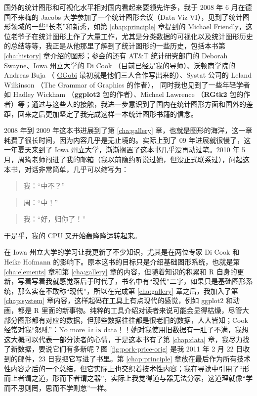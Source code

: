 \documentclass[
  b5paper,
  UTF8,twoside]{book}
\begin{document}
国外的统计图形和可视化水平相对国内看起来要领先许多，我于 2008 年 6 月在德国不来梅的 Jacobs 大学参加了一个统计图形会议（Data Viz VI），见到了统计图形领域的一些``长老''和新秀，如第 \ref{chap:principle} 章提到的 Michael Friendly，这位老爷子在统计图形上作了大量工作，尤其是分类数据的可视化以及统计图形历史的总结等等，我正是从他那里了解到了统计图形的一些历史，包括本书第 \ref{cha:history} 章介绍的图形；参会的还有 AT\&T 统计研究部门的 Deborah Swayne、Iowa 州立大学的 Di Cook （目前已经是我的导师）、沃顿商学院的 Andreas Buja （ \href{http://www.ggobi.org}{GGobi} 最初就是他们三人合作写出来的）、Systat 公司的 Leland Wilkinson （The Grammar of Graphics 的作者）， 同时我也见到了一些年轻学者如 Hadley Wickham （\textbf{ggplot2} 包的作者）、Michael Lawrence （\textbf{RGtk2} 包的作者）等；通过与这些人的接触，我进一步意识到了国内在统计图形方面和国外的差距，回来之后更加坚定了我完成这样一本统计图形书籍的信念。

2008 年到 2009 年这本书进展到了第 \ref{cha:gallery} 章，也就是图形的海洋，这一章耗费了很长时间，因为内容几乎是无止境的。实际上到了 09 年进展就很慢了，这一年夏天来到了 Iowa 州立大学，渐渐搁置了这本书几乎没再动过笔。2010 年 5 月，周筠老师闯进了我的邮箱（我以前隐约听说过她，但没正式联系过），问起这本书，对话非常简单，几乎可以缩写为：

\begin{quote}
我：``中不？''
\end{quote}

\begin{quote}
周：``中！''
\end{quote}

\begin{quote}
我：``好，归你了！''
\end{quote}

于是乎，我的 CPU 又开始轰隆隆运转起来。

在 Iowa 州立大学的学习让我更新了不少知识，尤其是在两位专家 Di Cook 和 Heike Hofmann 的影响下。原本这书的目标只是介绍基础图形系统，也就是第 \ref{cha:elements} 章和第 \ref{cha:gallery} 章的内容，但随着知识的积累和 R 自身的更新，写着写着我就感觉落后于时代了，书名中有``现代''二字，如果只是基础图形系统，那么实在不敢称``现代''，所以在完成第 \ref{cha:gallery} 章之后，我加入了第 \ref{chap:system} 章内容，这样起码在工具上有点现代的感觉，例如 ggplot2 和动画，都是 R 里面的新事物。纯粹的工具介绍对读者来说可能会显得枯燥，尽管大部分图形都有对应的数据，但那些数据往往都是很老旧的数据，人人皆知；Cook 经常对我``怒吼''：No more \texttt{iris} data！！她对我使用旧数据有一肚子不满，我想这大概可以代表一部分读者的心情，于是这本书有了第 \ref{chap:data} 章，我尽力找了新数据，要说它们有多新呢？图 \ref{fig:pork-price-orig} 是我 2011 年 2 月 22 日收到的邮件，23 日我把它写进了书里。第 \ref{chap:principle} 章放在最后作为所有技术性内容之后的一个总结，但它实际上也交织着技术性内容；我在导读中引用了``形而上者谓之道，形而下者谓之器''，实际上我觉得道与器无法分家，这道理就像``学而不思则罔，思而不学则怠''一样。
\end{document}
